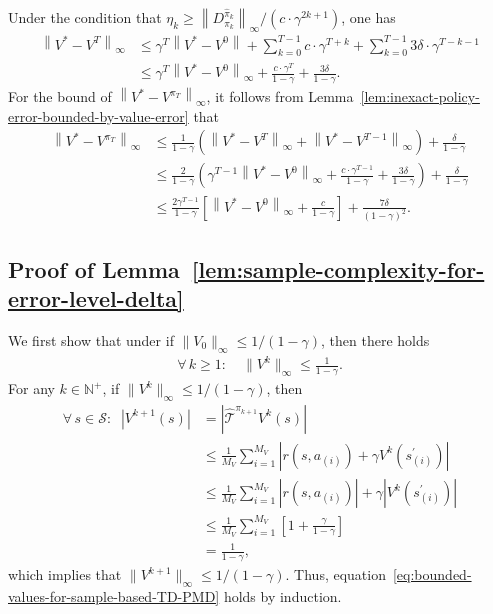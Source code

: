 \documentclass[10pt]{article}
\newcommand{\calS}{\mathcal{S}}
\newcommand{\calT}{\mathcal{T}}
\newcommand{\ls}{\left}
\newcommand{\rs}{\right}
\theoremstyle{plain}
\theoremstyle{definition}
\begin{document}
Under the condition that $\eta_k \geq {\ls\| {D}_{\pi_k}^{\widehat{\pi}_k} \rs\|_\infty}\big/{(c \cdot \gamma^{2k+1})}$, one has
\begin{align*}
    \ls\| V^* - V^T \rs\|_\infty &\leq \gamma^T \ls\| V^* - V^0 \rs\| + \sum_{k=0}^{T-1} c\cdot \gamma^{T+k} + \sum_{k=0}^{T-1} 3\delta\cdot \gamma^{T-k-1} \\
    &\leq \gamma^T \ls\| V^* - V^0 \rs\|_\infty + \frac{c\cdot \gamma^T}{1-\gamma} + \frac{3\delta}{1-\gamma}.
\end{align*}
For the bound of $\ls\| V^* - V^{\pi_T} \rs\|_\infty$, it follows from Lemma~\ref{lem:inexact-policy-error-bounded-by-value-error} that
\begin{align*}
    \ls\| V^* - V^{\pi_T} \rs\|_\infty &\leq \frac{1}{1-\gamma} \ls( \ls\| V^* - V^T \rs\|_\infty + \ls\| V^* - V^{T-1} \rs\|_\infty \rs) + \frac{\delta}{1-\gamma} \\
    &\leq \frac{2}{1-\gamma} \ls(  \gamma^{T-1} \ls\| V^* - V^0 \rs\|_\infty + \frac{c \cdot \gamma^{T-1}}{1-\gamma} + \frac{3\delta}{1-\gamma}\rs) + \frac{\delta}{1-\gamma} \\
    &\leq \frac{2\gamma^{T-1}}{1-\gamma} \ls[ \ls\| V^* - V^0 \rs\|_\infty + \frac{c}{1-\gamma} \rs] + \frac{7\delta}{(1-\gamma)^2}.
\end{align*}

\subsection{Proof of Lemma~\ref{lem:sample-complexity-for-error-level-delta}}
\label{sec:pf:lem:sample-complexity-for-error-level-delta}
We first show that under if $\| V_0 \|_\infty \leq 1/(1-\gamma)$, then there holds 
\begin{align}
    \forall\, k\geq 1: \quad \| V^k \|_\infty \leq \frac{1}{1-\gamma}. 
    \label{eq:bounded-values-for-sample-based-TD-PMD}
\end{align}
For any $k\in\mathbb{N}^+$, if $\| V^{k} \|_\infty \leq 1/(1-\gamma)$, then
\begin{align*}
    \forall\, s\in\calS: \;\; \ls|V^{k+1}(s)\rs| &= \ls|\widehat{\calT}^{\pi_{k+1}} V^k(s)\rs| \\
    &\leq \frac{1}{M_V} \sum_{i=1}^{M_V}\ls|r(s,a_{(i)}) + \gamma V^k(s^\prime_{(i)})\rs| \\
    &\leq \frac{1}{M_V} \sum_{i=1}^{M_V} \ls|r(s,a_{(i)})\rs| + \gamma \ls| V^k(s^\prime_{(i)}) \rs| \\
    &\leq \frac{1}{M_V} \sum_{i=1}^{M_V} \ls[1 + \frac{\gamma}{1-\gamma}\rs] \\
    &= \frac{1}{1-\gamma},
\end{align*}
which implies that $\| V^{k+1} \|_\infty \leq 1/(1-\gamma)$. Thus, equation~\eqref{eq:bounded-values-for-sample-based-TD-PMD} holds by induction. 
\end{document}
